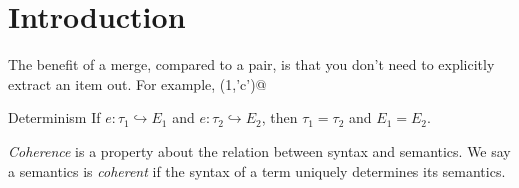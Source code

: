 \documentclass[nocopyrightspace,preprint,times,9pt]{sigplanconf}
\begin{document}


%
%

\section{Introduction}

The benefit of a merge, compared to a pair, is that you don't need to explicitly extract an item out. For example, \lstinline@fst (1,'c')@

\begin{definition}{Determinism}
If $e : \tau_1 \hookrightarrow E_1$ and $e : \tau_2 \hookrightarrow E_2$,
then $\tau_1 = \tau_2$ and $E_1 = E_2$.
\end{definition}

\emph{Coherence} is a property about the relation between syntax and semantics. We say a semantics is \emph{coherent} if the syntax of a term uniquely determines its semantics.
\end{document}
